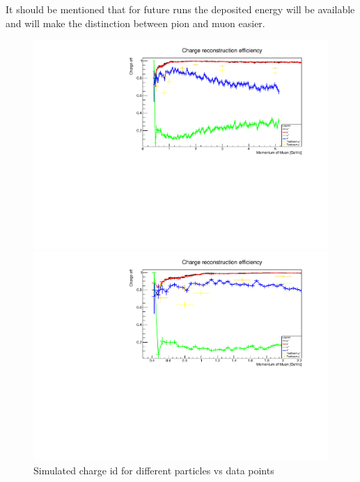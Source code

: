 It should be mentioned that for future runs the deposited energy will be available and will make the distinction between pion and muon easier.


\begin{figure}[h!]
\centering
\includegraphics[width=\textwidth]{figures/testbeam/TestBeam090318Plots/ChargeIDFullWPion.pdf}

\includegraphics[width=\textwidth]{figures/testbeam/TestBeam090318Plots/ChargeIDFullLowWPion.pdf}
\caption{Simulated charge id for different particles vs data points}
\label{fig:ChargeImprovedPion}
\end{figure}


